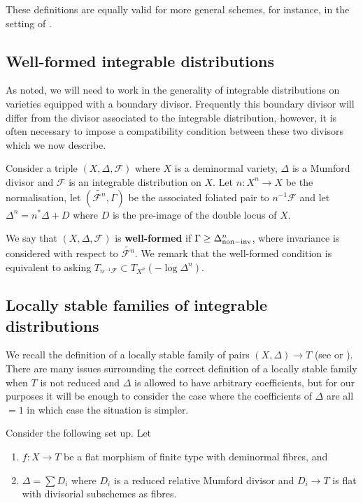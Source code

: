 \documentclass[12pt, a4paper]{amsart}
\newcounter{Theorem}
\theoremstyle{definition}
\theoremstyle{named}
\begin{document}
These definitions are equally valid for more general schemes, for instance, in the setting of \cite[Definition 1.5]{Kollar13}.


\subsection{Well-formed integrable distributions}
As noted, we will need to work in the generality of integrable distributions on varieties equipped with a boundary divisor.
Frequently this boundary divisor will differ from the divisor associated 
to the integrable distribution, however, it is often necessary to impose 
a compatibility condition between these two divisors which we now describe.


Consider a triple $(X, \Delta, \mathcal F)$
where $X$ is a deminormal variety, $\Delta$ is a Mumford divisor and $\mathcal F$ is an integrable distribution on $X$.
Let $n\colon X^n \rightarrow X$ be the normalisation, let $(\tilde{\mathcal F^n}, \Gamma)$ be the associated foliated pair to $n^{-1}\mathcal F$ and let $\Delta^n = n^*\Delta+D$ where $D$ is the pre-image of the double locus of $X$.



We say that $(X, \Delta, \mathcal F)$ is {\bf well-formed} if 
$\Gamma \ge \Delta^n_{{\rm non-inv}}$,
where invariance is considered with respect to $\tilde{\mathcal F^n}$. We remark that the well-formed condition is equivalent to asking 
$T_{n^{-1}\mathcal F} \subset T_{X^n}(-\log \Delta^n)$.


\subsection{Locally stable families of integrable distributions}
\label{s_locally_stable_def}
We recall the definition of a locally stable family of pairs $(X, \Delta) \rightarrow T$ (see \cite[Definition-Theorem 4.7]{modbook} or \cite[\S 6.22]{modbook}). 
There are many issues surrounding the correct definition of a locally stable family when $T$ is not reduced and $\Delta$ is allowed to have arbitrary coefficients, but for our purposes it will be enough to consider the case where the coefficients of $\Delta$ are all $=1$ in which case the situation is simpler.

Consider the following set up.
Let 
\begin{enumerate}
    \item $f\colon X \rightarrow T$ be a flat morphism of finite type with deminormal fibres, and
    \item $\Delta = \sum D_i$ where $D_i$ is a reduced relative Mumford divisor and $D_i \to T$ is flat with divisorial subschemes as fibres.
\end{enumerate}
\end{document}
